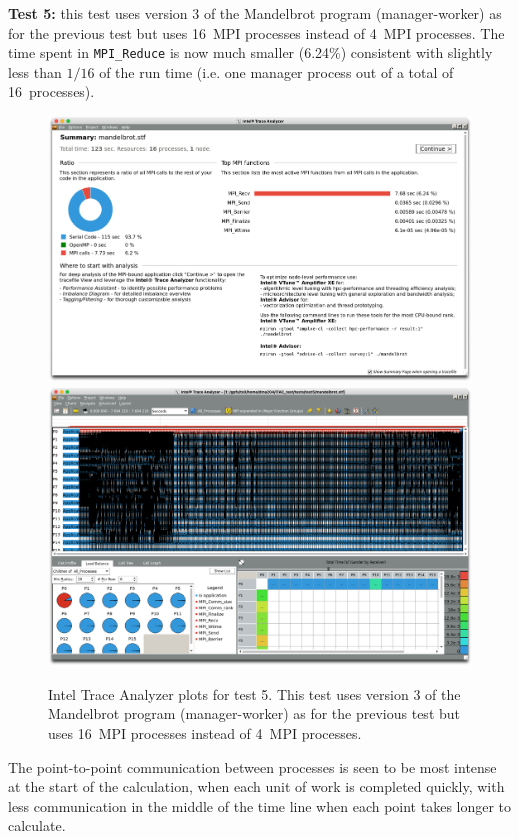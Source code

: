 \documentclass[a4paper,titlepage]{article}
\begin{document}
\noindent
\textbf{Test 5:} this test uses version 3 of the Mandelbrot program (manager-worker) as for the previous test but uses 16~MPI processes instead of 4~MPI processes. The time spent in \verb+MPI_Reduce+ is now much smaller (6.24\%) consistent with slightly less than $1/16$ of the run time (i.e. one manager process out of a total of 16~processes). 
\begin{figure}[htbp]
\begin{center}
\includegraphics[scale=0.3]{figures/test5_summary}
\includegraphics[scale=0.3]{figures/test5_eventTimeline}
\caption{Intel Trace Analyzer plots for test 5. This test uses version 3 of the Mandelbrot program (manager-worker) as for the previous test but uses 16~MPI processes instead of 4~MPI processes.}
\label{fig:test5_ITAC_summary}
\end{center}
\end{figure}
The point-to-point communication between processes is seen to be most intense at the start of the calculation, when each unit of work is completed quickly, with less communication in the middle of the time line when each point takes longer to calculate. 
\end{document}
